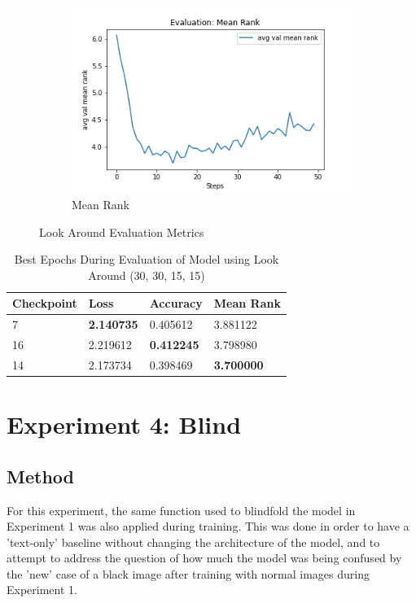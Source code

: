 \begin{figure}[h]
\begin{subfigure}[b]{0.3\textwidth}
         \includegraphics[width=\textwidth]{./figure/results/look_around/eval/avg val mean rank.png}
         \caption{Mean Rank}
         \label{fig:la_e_mean_rank}
     \end{subfigure}
     \caption{Look Around Evaluation Metrics}
     \label{fig:la_e_metrics}
\end{figure}

\begin{table}[h]
\centering
\caption{Best Epochs During Evaluation of Model using Look Around (30, 30, 15, 15)}
\begin{tabular}{l | l | l | l}
Checkpoint & Loss & Accuracy & Mean Rank \\
\hline
7 & \textbf{2.140735} & 0.405612 & 3.881122 \\
16 & 2.219612 & \textbf{0.412245} & 3.798980 \\
14 & 2.173734 & 0.398469 & \textbf{3.700000} 
\end{tabular}
\label{tab:best_look_around}
\end{table}

\section{Experiment 4: Blind}
\label{sec:exp_4}
\subsection{Method}
For this experiment, the same function used to blindfold the model in Experiment 1 was also applied during training. This was done in order to have a 'text-only' baseline without changing the architecture of the model, and to attempt to address the question of how much the model was being confused by the 'new' case of a black image after training with normal images during Experiment 1. 

